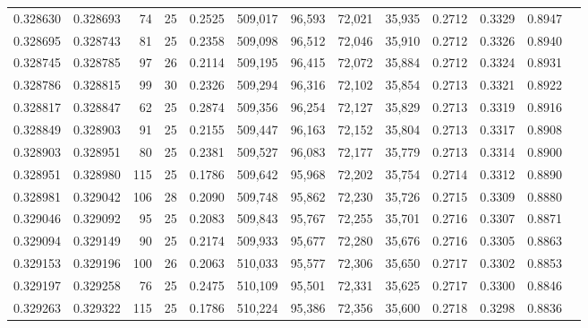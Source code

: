 \begin{tabular}{rrrrrrrrrrrrr}
0.328630 & 0.328693 &    74 &  25 &                                     0.2525 & 509,017 &  96,593 &  72,021 &  35,935 & 0.2712 & 0.3329 & 0.8947 \\
0.328695 & 0.328743 &    81 &  25 &                                     0.2358 & 509,098 &  96,512 &  72,046 &  35,910 & 0.2712 & 0.3326 & 0.8940 \\
0.328745 & 0.328785 &    97 &  26 &                                     0.2114 & 509,195 &  96,415 &  72,072 &  35,884 & 0.2712 & 0.3324 & 0.8931 \\
0.328786 & 0.328815 &    99 &  30 &                                     0.2326 & 509,294 &  96,316 &  72,102 &  35,854 & 0.2713 & 0.3321 & 0.8922 \\
0.328817 & 0.328847 &    62 &  25 &                                     0.2874 & 509,356 &  96,254 &  72,127 &  35,829 & 0.2713 & 0.3319 & 0.8916 \\
0.328849 & 0.328903 &    91 &  25 &                                     0.2155 & 509,447 &  96,163 &  72,152 &  35,804 & 0.2713 & 0.3317 & 0.8908 \\
0.328903 & 0.328951 &    80 &  25 &                                     0.2381 & 509,527 &  96,083 &  72,177 &  35,779 & 0.2713 & 0.3314 & 0.8900 \\
0.328951 & 0.328980 &   115 &  25 &                                     0.1786 & 509,642 &  95,968 &  72,202 &  35,754 & 0.2714 & 0.3312 & 0.8890 \\
0.328981 & 0.329042 &   106 &  28 &                                     0.2090 & 509,748 &  95,862 &  72,230 &  35,726 & 0.2715 & 0.3309 & 0.8880 \\
0.329046 & 0.329092 &    95 &  25 &                                     0.2083 & 509,843 &  95,767 &  72,255 &  35,701 & 0.2716 & 0.3307 & 0.8871 \\
0.329094 & 0.329149 &    90 &  25 &                                     0.2174 & 509,933 &  95,677 &  72,280 &  35,676 & 0.2716 & 0.3305 & 0.8863 \\
0.329153 & 0.329196 &   100 &  26 &                                     0.2063 & 510,033 &  95,577 &  72,306 &  35,650 & 0.2717 & 0.3302 & 0.8853 \\
0.329197 & 0.329258 &    76 &  25 &                                     0.2475 & 510,109 &  95,501 &  72,331 &  35,625 & 0.2717 & 0.3300 & 0.8846 \\
0.329263 & 0.329322 &   115 &  25 &                                     0.1786 & 510,224 &  95,386 &  72,356 &  35,600 & 0.2718 & 0.3298 & 0.8836 \\

\end{tabular}
